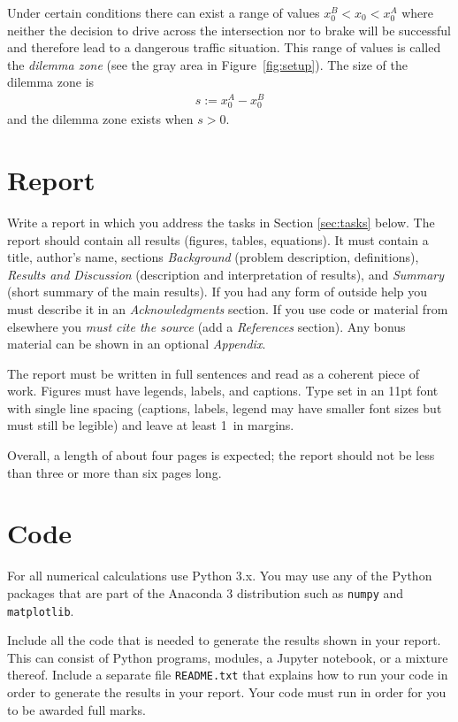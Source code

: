 \documentclass[letterpaper]{scrartcl}
\begin{document}
Under certain conditions there can exist a range of values
$x_{0}^{B} < x_{0} < x_{0}^{A}$ where neither the decision to drive
across the intersection nor to brake will be successful and therefore
lead to a dangerous traffic situation. This range of values is called
the \emph{dilemma zone} (see the gray area in
Figure~\ref{fig:setup}). The size of the dilemma zone is
\begin{gather}
  \label{eq:dilemma}
  s := x_{0}^{A} - x_{0}^{B}
\end{gather}
and the dilemma zone exists when $s > 0$.

\section{Report}
\label{sec:report}

Write a report in which you address the tasks in Section
\ref{sec:tasks} below. The report should contain all results (figures,
tables, equations). It must contain a title, author's name, sections
\emph{Background} (problem description, definitions), \emph{Results
  and Discussion} (description and interpretation of results), and
\emph{Summary} (short summary of the main results). If you had any
form of outside help you must describe it in an \emph{Acknowledgments}
section. If you use code or material from elsewhere you \emph{must
  cite the source} (add a \emph{References} section). Any bonus
material can be shown in an optional \emph{Appendix}.

The report must be written in full sentences and read as a coherent
piece of work. Figures must have legends, labels, and captions. Type
set in an 11pt font with single line spacing (captions, labels, legend
may have smaller font sizes but must still be legible) and leave at
least 1~in margins. 

Overall, a length of about four pages is expected; the report should
not be less than three or more than six pages long.

\section{Code}
\label{sec:code}

For all numerical calculations use Python 3.x. You may use any of the
Python packages that are part of the Anaconda 3 distribution such as
\texttt{numpy} and \texttt{matplotlib}. 

Include all the code that is needed to generate the results shown in
your report. This can consist of Python programs, modules, a Jupyter
notebook, or a mixture thereof. Include a separate file
\texttt{README.txt} that explains how to run your code in order to
generate the results in your report. Your code must run in order for
you to be awarded full marks.
\end{document}
